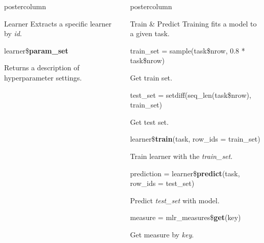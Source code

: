 \documentclass{beamer}
\newlength{\columnheight} %
\begin{document}
\begin{frame}[fragile]{}
\begin{columns}
\begin{column}{.31\textwidth}
\begin{beamercolorbox}[center]{postercolumn}
\begin{minipage}{.98\textwidth}
{\begin{myblock}{Learner}
						\hspace*{1ex}Extracts a specific learner by \textit{id}.
						\\
						\begin{codebox}
							learner\$\textbf{param\_set}
						\end{codebox}
						\hspace*{1ex}Returns a description of hyperparameter settings.
					\end{myblock}\vfill
				}
			\end{minipage}
		\end{beamercolorbox}
	\end{column}
	\begin{column}{.31\textwidth}
		\begin{beamercolorbox}[center]{postercolumn}
			\begin{minipage}{.98\textwidth}
				\parbox[t][\columnheight]{\textwidth}{
					\begin{myblock}{Train \& Predict}
						Training fits a model to a given task. 
						\\
						\begin{codebox}
							train\_set = sample(task\$nrow, 0.8 * task\$nrow)
						\end{codebox}
						\hspace*{1ex}Get train set.
						\\
						\begin{codebox}
							test\_set = setdiff(seq\_len(task\$nrow), train\_set)
						\end{codebox}
						\hspace*{1ex}Get test set.
						\\
						\begin{codebox}
							learner\$\textbf{train}(task, row\_ids = train\_set)
						\end{codebox}
						\hspace*{1ex}Train learner with the \textit{train\_set}.
						\\
						\begin{codebox}
							prediction = learner\$\textbf{predict}(task, row\_ids = test\_set)
						\end{codebox}
						\hspace*{1ex}Predict \textit{test\_set} with model.
						\\
						\begin{codebox}
							measure = mlr\_measures\$\textbf{get}(key)
						\end{codebox}
						\hspace*{1ex}Get measure by \textit{key}.

\end{myblock}}
\end{minipage}
\end{beamercolorbox}
\end{column}
\end{columns}
\end{frame}
\end{document}
